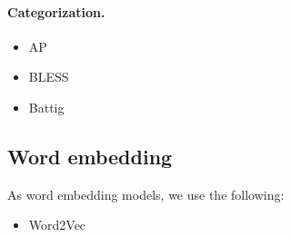 \documentclass{article}
\begin{document}
    \paragraph{Categorization.}
    
    \begin{itemize}
        \item AP~\cite{almuhareb2005concept}
        \item BLESS~\cite{baroni2011we}
        \item Battig~\cite{battig1969category}
    \end{itemize}
    
    
    \subsection{Word embedding}\label{sec:baselinse}
    
    As word embedding models, we use the following:
    
    \begin{itemize}
        \item Word2Vec~\cite{mikolov2013efficient}
    \end{itemize}


    
    
%    
\end{document}
